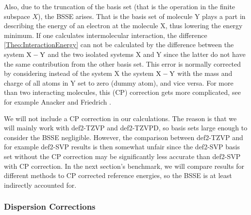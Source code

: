 \documentclass[8.5pt,twoside,twocolumn]{article}
\theoremstyle{standard}
\begin{document}
Also, due to the truncation of the basis set (that is the operation in the finite subspace $X$),
the  BSSE arises. That is the basis set of molecule Y plays a
part in describing the energy of an electron at the molecule X, thus lowering the energy minimum.
If one calculates intermolecular interaction, the difference \eqref{Theo:InteractionEnergy} 
can not be calculated by the difference between the system ${{\text X - \text Y}}$ and the two isolated systems
X and Y since the latter do not have the same contribution from the other basis set.
This error is normally corrected by considering instead of the system X the system ${{\text X - \text Y}}$
with the mass and charge of all atoms in Y set to zero (dummy atom), and vice versa.
For more than two interacting molecules, this  (CP) correction
gets more complicated, see for example Anacker and Friedrich \cite{Anacker2014}.

We will not include a CP correction in our calculations. The reason is that we will mainly
work with def2-TZVP and def2-TZVPD, so basis sets large enough to consider the 
BSSE negligible. However, the comparison between def2-TZVP and for example
def2-SVP results is then somewhat unfair since the def2-SVP basis set without the CP correction
may be significantly less accurate than def2-SVP with CP correction. In the next
section's benchmark, we will compare results for different methods to CP corrected reference 
energies, so the BSSE is at least indirectly accounted for.


\subsubsection{Dispersion Corrections}
\end{document}
